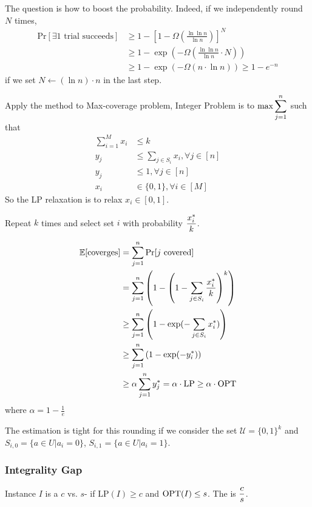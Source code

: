 The question is how to boost the probability. Indeed, if we independently round  $ N  $ times, 
\begin{align*}
    \mathrm{Pr}[\exists 1\text{ trial succeeds}]& \geq 1-[1-\Omega(\frac{\ln\ln n}{\ln n})]^N\\
    & \geq 1-\exp(-\Omega(\frac{\ln\ln n}{\ln n}\cdot N))\\
    & \geq 1-\exp(-\Omega(n\cdot\ln n)) \geq 1-e^{-n}
\end{align*}
if we set  $ N\leftarrow (\ln n)\cdot n $ in the last step.

Apply the method to Max-coverage problem, Integer Problem is to  $\max \displaystyle\sum_{j=1}^n$ such that 
\begin{align*}
    \sum_{i=1}^M x_i &\leq k\\
    y_j& \leq \sum_{j\in S_i}x_i,\forall j\in [n]\\
    y_j& \leq 1,\forall j\in [n]\\
    x_i&\in\{0,1\},\forall i\in [M]
\end{align*} 
So the LP relaxation is to relax  $ x_i\in [0,1] $. 

Repeat  $ k  $ times and select set  $ i  $ with probability  $ \displaystyle\frac{x_i^*}{k} $.

\begin{align*}
    \mathbb E[\text{coverges}]& =\sum_{j=1}^n\mathrm{Pr}[j\text{ covered}]\\
    &=\sum_{j=1}^n\left(1-\left(1-\sum_{j\in S_i}\frac{x_i^*}{k}\right)^k\right)\\
    & \geq \sum_{j=1}^n\left(1-\exp(-\sum_{j\in S_i}x_i^*)\right)\\
    & \geq \sum_{j=1}^n\left(1-\exp(-y_i^*)\right)\\
    & \geq \alpha\sum_{j=1}^n y_j^*=\alpha\cdot \mathrm{LP} \geq \alpha\cdot \mathrm{OPT}
\end{align*}
where  $ \alpha=1-\frac{1}{e} $ 

The estimation is tight for this rounding if we consider the set  $ \mathcal{U}=\{0,1\}^k $ and  $ S_{i,0}=\{a\in U|a_i=0\} $,  $ S_{i,1}=\{a\in U|a_i=1\} $.   


\subsubsection{Integrality Gap}
Instance  $ I  $ is a  $ c $ vs.  $ s $- if  $ \mathrm{LP}(I) \geq c $ and  $ \mathrm{OPT}(I) \leq s $. The  is  $\displaystyle \frac{c}{s} $. 

